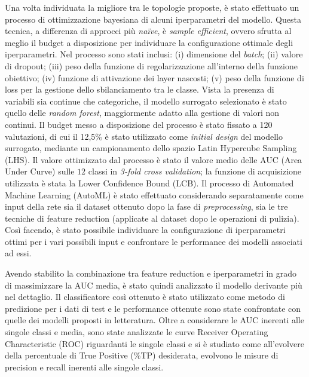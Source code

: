 Una volta individuata la migliore tra le topologie proposte, è stato effettuato un processo di ottimizzazione bayesiana di alcuni iperparametri del modello. 
Questa tecnica, a differenza di approcci più \textit{na\"ive}, è \textit{sample efficient}, ovvero sfrutta al meglio il budget a disposizione per individuare la configurazione ottimale degli iperparametri. 
Nel processo sono stati inclusi: (i) dimensione del \textit{batch}; (ii) valore di dropout; (iii) peso della funzione di regolarizzazione all'interno della funzione obiettivo; (iv) funzione di attivazione dei layer nascosti; (v) peso della funzione di loss per la gestione dello sbilanciamento tra le classe.
Vista la presenza di variabili sia continue che categoriche, il modello surrogato selezionato è stato quello delle \textit{random forest}, maggiormente adatto alla gestione di valori non continui. 
Il budget messo a disposizione del processo è stato fissato a 120 valutazioni, di cui il 12,5\% è stato utilizzato come \textit{initial design} del modello surrogato, mediante un campionamento dello spazio Latin Hypercube Sampling (LHS). 
Il valore ottimizzato dal processo è stato il valore medio delle AUC (Area Under Curve) sulle $12$ classi in \textit{3-fold cross validation}; la funzione di acquisizione utilizzata è stata la Lower Confidence Bound (LCB).
Il processo di Automated Machine Learning (AutoML) è stato effettuato considerando separatamente come input della rete sia il dataset ottenuto dopo la fase di \textit{preprocessing}, sia le tre tecniche di feature reduction (applicate al dataset dopo le operazioni di pulizia).
Così facendo, è stato possibile individuare la configurazione di iperparametri ottimi per i vari possibili input e confrontare le performance dei modelli associati ad essi.

Avendo stabilito la combinazione tra feature reduction e iperparametri in grado di massimizzare la AUC media, è stato quindi analizzato il modello derivante più nel dettaglio.
Il classificatore così ottenuto è stato utilizzato come metodo di predizione per i dati di test e le performance ottenute sono state confrontate con quelle dei modelli proposti in letteratura.
Oltre a considerare le AUC inerenti alle singole classi e media, sono state analizzate le curve Receiver Operating Characteristic (ROC) riguardanti le singole classi e si è studiato come all'evolvere della percentuale di True Positive (\%TP) desiderata, evolvono le misure di precision e recall inerenti alle singole classi.